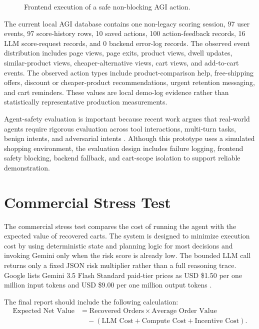 \documentclass{article}
\begin{document}
\begin{figure}[htbp]
  \centering
  \caption{Frontend execution of a safe non-blocking AGI action.}
  \label{fig:frontend-action}
\end{figure}

The current local AGI database contains one non-legacy scoring session, 97 user events, 97 score-history rows, 10 saved actions, 100 action-feedback records, 16 LLM score-request records, and 0 backend error-log records. The observed event distribution includes page views, page exits, product views, dwell updates, similar-product views, cheaper-alternative views, cart views, and add-to-cart events. The observed action types include product-comparison help, free-shipping offers, discount or cheaper-product recommendations, urgent retention messaging, and cart reminders. These values are local demo-log evidence rather than statistically representative production measurements.

Agent-safety evaluation is important because recent work argues that real-world agents require rigorous evaluation across tool interactions, multi-turn tasks, benign intents, and adversarial intents \cite{vijayvargiya2025openagentsafety}. Although this prototype uses a simulated shopping environment, the evaluation design includes failure logging, frontend safety blocking, backend fallback, and cart-scope isolation to support reliable demonstration.

\section{Commercial Stress Test}
The commercial stress test compares the cost of running the agent with the expected value of recovered carts. The system is designed to minimize execution cost by using deterministic state and planning logic for most decisions and invoking Gemini only when the risk score is already low. The bounded LLM call returns only a fixed JSON risk multiplier rather than a full reasoning trace. Google lists Gemini 3.5 Flash Standard paid-tier prices as USD \$1.50 per one million input tokens and USD \$9.00 per one million output tokens \cite{google2026pricing}.

The final report should include the following calculation:
\begin{align*}
\text{Expected Net Value}
&= \text{Recovered Orders} \times \text{Average Order Value} \\
&\quad - (\text{LLM Cost} + \text{Compute Cost} + \text{Incentive Cost}).
\end{align*}
\end{document}
